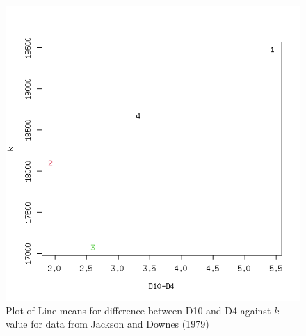 %

\begin{figure}[h]
  \centering
   \includegraphics[width=1.1\textwidth]{SDP/d10md4xklm.png}
  \caption{Plot of Line means for difference between D10 and D4 against $k$ value for data from Jackson and Downes (1979)~\cite{jack:79}}
  \label{fig:d10md4xklm}
\end{figure}

%

